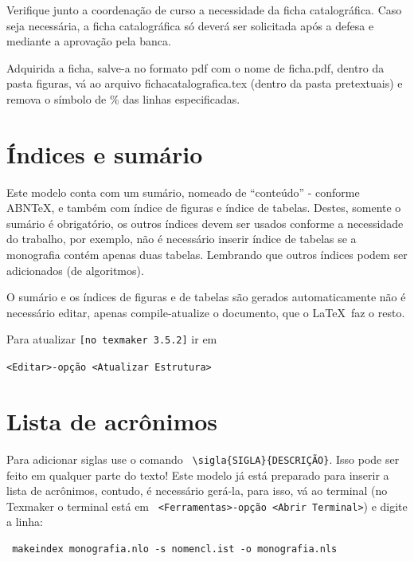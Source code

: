 Verifique junto a coordenação de curso a necessidade da ficha catalográfica. Caso seja necessária, a ficha catalográfica só deverá ser solicitada após a defesa e mediante a aprovação pela banca.  

Adquirida a ficha, salve-a no formato pdf com o nome de ficha.pdf, dentro da pasta figuras, vá ao arquivo fichacatalografica.tex (dentro da pasta pretextuais) e remova o símbolo de \% das linhas especificadas.

\section{Índices e sumário}
 	 	
Este modelo conta com um sumário, nomeado de ``conteúdo'' - conforme ABN\TeX, e também com índice de figuras e índice de tabelas. Destes, somente o sumário é obrigatório, os outros índices devem ser usados conforme a necessidade do trabalho, por exemplo, não é necessário inserir índice de tabelas se a monografia contém apenas duas tabelas. Lembrando que outros índices podem ser adicionados (de algoritmos).

O sumário e os índices de figuras e de tabelas são gerados automaticamente não é necessário editar, apenas compile-atualize o documento, que o \LaTeX\ faz o resto.

 	
Para atualizar \verb+[no texmaker 3.5.2]+ ir em 

\verb+<Editar>-opção <Atualizar Estrutura>+


\section{Lista de acrônimos}

Para adicionar siglas use o comando \verb+ \sigla{SIGLA}{DESCRIÇÃO}+. Isso pode ser feito em qualquer parte do texto! Este modelo já está preparado para inserir a lista de acrônimos, contudo, é necessário gerá-la, para isso, vá ao terminal (no Texmaker o terminal está em \verb+ <Ferramentas>-opção <Abrir Terminal>+)	e digite a linha:


\begin{verbatim} makeindex monografia.nlo -s nomencl.ist -o monografia.nls 
\end{verbatim}




